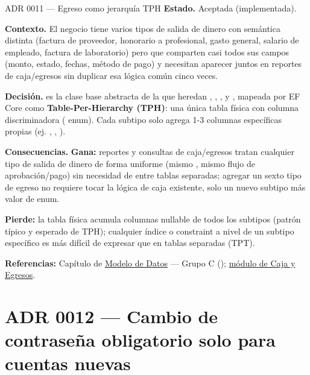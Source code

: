 \begin{cajaADR}{ADR 0011 --- Egreso como jerarquía TPH}
\textbf{Estado.} Aceptada (implementada).

\textbf{Contexto.} El negocio tiene varios tipos de salida de dinero con semántica distinta (factura de proveedor, honorario a profesional, gasto general, salario de empleado, factura de laboratorio) pero que comparten casi todos sus campos (monto, estado, fechas, método de pago) y necesitan aparecer juntos en reportes de caja/egresos sin duplicar esa lógica común cinco veces.

\textbf{Decisión.}  es la clase base abstracta de la que heredan , , ,  y \allowbreak {}\allowbreak {}, mapeada por EF Core como \textbf{Table-Per-Hierarchy (TPH)}: una única tabla física  con columna discriminadora  ( enum). Cada subtipo solo agrega 1-3 columnas específicas propias (ej. \allowbreak {}, \allowbreak {}, \allowbreak {}).

\textbf{Consecuencias.} \textbf{Gana:} reportes y consultas de caja/egresos tratan cualquier tipo de salida de dinero de forma uniforme (mismo , mismo flujo de aprobación/pago) sin necesidad de  entre tablas separadas; agregar un sexto tipo de egreso no requiere tocar la lógica de caja existente, solo un nuevo subtipo más valor de enum.

\textbf{Pierde:} la tabla física  acumula columnas nullable de todos los subtipos (patrón típico y esperado de TPH); cualquier índice o constraint a nivel de un subtipo específico es más difícil de expresar que en tablas separadas (TPT).
\end{cajaADR}

\textbf{Referencias:} Capítulo de \hyperref[sec:modelo-datos]{Modelo de Datos} --- Grupo C (); \hyperref[mod:11-caja-y-egresos]{módulo de Caja y Egresos}.

\section{ADR 0012 --- Cambio de contraseña obligatorio solo para cuentas nuevas}
\label{adr:0012}


